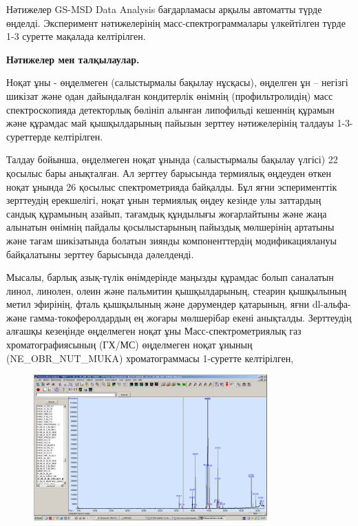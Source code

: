 Нәтижелер GS-MSD Data Analysis бағдарламасы арқылы автоматты түрде
өңделді. Эксперимент нәтижелерінің масс-спектрограммалары үлкейтілген
түрде 1-3 суретте мақалада келтірілген.

{\bfseries Нәтижелер мен талқылаулар.}

Ноқат ұны - өңделмеген (салыстырмалы бақылау нұсқасы), өңделген ұн --
негізгі шикізат және одан дайындалған кондитерлік өнімнің
(профильтролидің) масс спектроскопияда детекторлық бөлініп алынған
липофильді кешеннің құрамын және құрамдас май қышқылдарының пайызын
зерттеу нәтижелерінің талдауы 1-3-суреттерде келтірілген.

Талдау бойынша, өңделмеген ноқат ұнында (салыстырмалы бақылау үлгісі) 22
қосылыс бары анықталған. Ал зерттеу барысында термиялық өңдеуден өткен
ноқат ұнында 26 қосылыс спектрометрияда байқалды. Бұл яғни эсперименттік
зерттеудің ерекшелігі, ноқат ұнын термиялық өңдеу кезінде улы заттардың
сандық құрамының азайып, тағамдық құндылығы жоғарлайтыны және жаңа
алынатын өнімнің пайдалы қосылыстарының пайыздық мөлшерінің артатыны
және тағам шикізатында болатын зиянды компоненттердің модификациялануы
байқалатыны зерттеу барысында дәлелденді.

Мысалы, барлық азық-түлік өнімдерінде маңызды құрамдас болып саналатын
линол, линолен, олеин және пальмитин қышқылдарының, стеарин қышқылының
метил эфирінің, фталь қышқылының және дәрумендер қатарының, яғни
dl-альфа- және гамма-токоферолдардың ең жоғары мөлшерібар екені
анықталды. Зерттеудің алғашқы кезеңінде өңделмеген ноқат ұны
Масс-спектрометриялық газ хроматографиясының (ГХ/МС) өңделмеген ноқат
ұнының (NE\_OBR\_NUT\_MUKA) хроматограммасы 1-суретте келтірілген,

\begin{figure}[H]
	\centering
	\includegraphics[width=0.8\textwidth]{media/pish/image13}
	\caption*{}
\end{figure}


